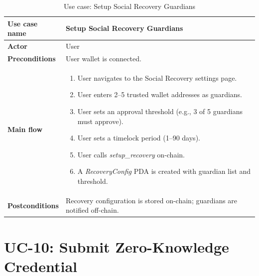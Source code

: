 \begin{table}[H]
\centering
\caption{Use case: Setup Social Recovery Guardians}
\begin{tabular}{|l|p{10cm}|}
\hline
\textbf{Use case name} & Setup Social Recovery Guardians \\ \hline
\textbf{Actor} & User \\ \hline
\textbf{Preconditions} & User wallet is connected. \\ \hline
\textbf{Main flow} & \begin{enumerate}[noitemsep]
    \item User navigates to the Social Recovery settings page.
    \item User enters 2--5 trusted wallet addresses as guardians.
    \item User sets an approval threshold (e.g., 3 of 5 guardians must approve).
    \item User sets a timelock period (1--90 days).
    \item User calls \emph{setup\_recovery} on-chain.
    \item A \emph{RecoveryConfig} PDA is created with guardian list and threshold.
\end{enumerate} \\ \hline
\textbf{Postconditions} & Recovery configuration is stored on-chain; guardians are notified off-chain. \\ \hline
\end{tabular}
\end{table}

\section*{UC-10: Submit Zero-Knowledge Credential}

